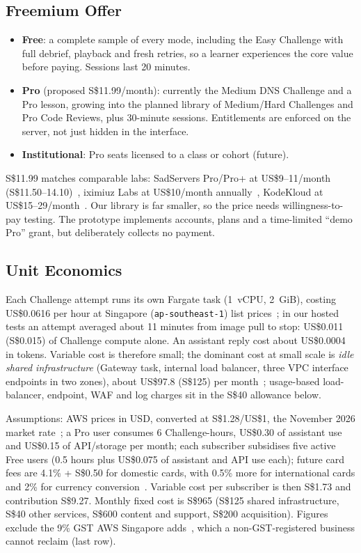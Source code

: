 \documentclass[11pt,a4paper]{article}
\begin{document}
\subsection{Freemium Offer}
\begin{itemize}
  \item \textbf{Free}: a complete sample of every mode, including the Easy
  Challenge with full debrief, playback and fresh retries, so a learner
  experiences the core value before paying. Sessions last 20 minutes.
  \item \textbf{Pro} (proposed S\$11.99/month): currently the Medium DNS Challenge and a
  Pro lesson, growing into the planned library of Medium/Hard Challenges and Pro
  Code Reviews, plus 30-minute sessions. Entitlements are
  enforced on the server, not just hidden in the interface.
  \item \textbf{Institutional}: Pro seats licensed to a class or cohort (future).
\end{itemize}
S\$11.99 matches comparable labs: SadServers Pro/Pro+ at US\$9--11/month
(S\$11.50--14.10)~\cite{sadservers}, iximiuz Labs at US\$10/month
annually~\cite{iximiuz}, KodeKloud at US\$15--29/month~\cite{kodekloud}. Our
library is far smaller, so the price needs willingness-to-pay testing. The prototype implements accounts, plans and a time-limited
``demo Pro'' grant, but deliberately collects no payment.

\subsection{Unit Economics}
Each Challenge attempt runs its own Fargate task (1~vCPU, 2~GiB), costing
US\$0.0616 per hour at Singapore (\texttt{ap-southeast-1}) list
prices~\cite{aws-fargate}; in our hosted tests an attempt averaged about
11 minutes from image pull to stop: US\$0.011 (S\$0.015) of Challenge compute
alone. An assistant reply cost about US\$0.0004 in tokens. Variable cost is therefore
small; the dominant cost at small scale is \emph{idle shared infrastructure}
(Gateway task, internal load balancer, three VPC interface endpoints in two
zones), about US\$97.8 (S\$125) per month~\cite{aws-vpc,aws-alb}; usage-based
load-balancer, endpoint, WAF and log charges sit in the S\$40 allowance below.

Assumptions: AWS prices in USD, converted at S\$1.28/US\$1, the November 2026
market rate~\cite{fx}; a Pro user consumes 6 Challenge-hours,
US\$0.30 of assistant use and US\$0.15 of API/storage per month; each subscriber
subsidises five active Free users (0.5 hours plus US\$0.075 of assistant and API
use each); future card fees are 4.1\% + S\$0.50 for domestic cards, with 0.5\%
more for international cards and 2\% for currency conversion~\cite{stripe}.
Variable cost per subscriber is then S\$1.73 and contribution S\$9.27. Monthly
fixed cost is S\$965 (S\$125 shared infrastructure, S\$40 other services,
S\$600 content and support, S\$200 acquisition). Figures exclude the 9\% GST AWS
Singapore adds~\cite{aws-gst}, which a non-GST-registered business cannot reclaim (last row).
\end{document}
